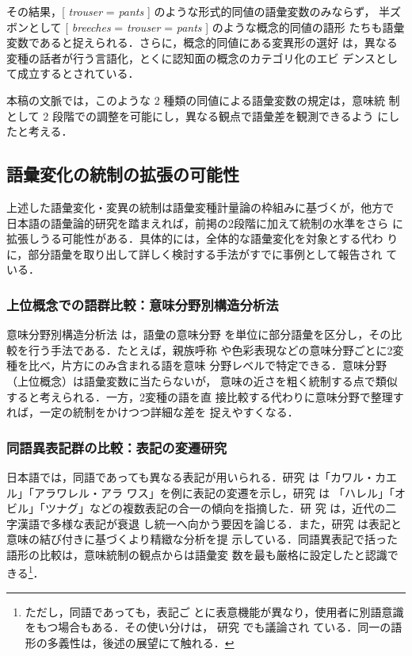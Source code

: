 \documentclass[submit]{ipsj}
\begin{document}
その結果，[ \emph{trouser} = \emph{pants} ] のような形式的同値の語彙変数のみならず，
半ズボンとして [ \emph{breeches} = \emph{trouser} = \emph{pants} ] のような概念的同値の語形
たちも語彙変数であると捉えられる．さらに，概念的同値にある変異形の選好
は，異なる変種の話者が行う言語化，とくに認知面の概念のカテゴリ化のエビ
デンスとして成立するとされている\cite{DePascale2019Tokenbased}．

本稿の文脈では，このような 2 種類の同値による語彙変数の規定は，意味統
制として 2 段階での調整を可能にし，異なる観点で語彙差を観測できるよう
にしたと考える．
\subsection{語彙変化の統制の拡張の可能性\label{org6725f08}}
\label{sec:orgf2f445c}
上述した語彙変化・変異の統制は語彙変種計量論の枠組みに基づくが，他方で
日本語の語彙論的研究を踏まえれば，前掲の2段階に加えて統制の水準をさら
に拡張しうる可能性がある．具体的には，全体的な語彙変化を対象とする代わ
りに，部分語彙を取り出して詳しく検討する手法がすでに事例として報告され
ている．
\subsubsection{上位概念での語群比較：意味分野別構造分析法}
\label{sec:org0339bd4}
意味分野別構造分析法 \cite{tajima2000Goikenkyu} は，語彙の意味分野
を単位に部分語彙を区分し，その比較を行う手法である．たとえば，親族呼称
や色彩表現などの意味分野ごとに2変種を比べ，片方にのみ含まれる語を意味
分野レベルで特定できる．意味分野（上位概念）は語彙変数に当たらないが，
意味の近さを粗く統制する点で類似すると考えられる．一方，2変種の語を直
接比較する代わりに意味分野で整理すれば，一定の統制をかけつつ詳細な差を
捉えやすくなる．
\subsubsection{同語異表記群の比較：表記の変遷研究}
\label{sec:org4ad36b6}
日本語では，同語であっても異なる表記が用いられる．研究
\cite{takahashi2019Kindai} は「カワル・カエル」「アラワレル・アラ
ワス」を例に表記の変遷を示し，研究 \cite{takahashi2016Kindai} は
「ハレル」「オビル」「ツナグ」などの複数表記の合一の傾向を指摘した．研
究 \cite{mabuchi2016Kindai} は，近代の二字漢語で多様な表記が衰退
し統一へ向かう要因を論じる．また，研究 \cite{takahashi2016Kindai,takahashi2019Kindai} は表記と意味の結び付きに基づくより精緻な分析を提
示している．同語異表記で括った語形の比較は，意味統制の観点からは語彙変
数を最も厳格に設定したと認識できる\footnote{ただし，同語であっても，表記ご
とに表意機能が異なり，使用者に別語意識をもつ場合もある．その使い分けは，
研究 \cite{takahashi2025Tango,takahashi2019Kindai} でも議論され
ている．同一の語形の多義性は，後述の展望にて触れる．}．
\end{document}
